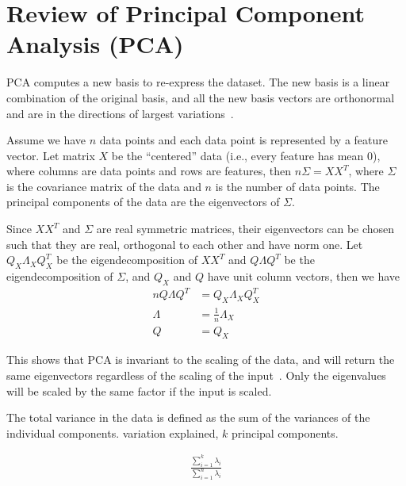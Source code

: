 \chapter{Review of Principal Component Analysis (PCA)}\label{app-pca}
PCA computes a new basis to re-express the dataset. The new basis is a linear
combination of the original basis, and all the new basis vectors are orthonormal
and are in the directions of largest variations~\cite{shlens2005}.

Assume we have $n$ data points and each data point is represented by a feature
vector. Let matrix $X$ be the ``centered'' data (i.e., every feature has mean
0), where columns are data points and rows are features, then $n\Sigma = XX^T$,
where $\Sigma$ is the covariance matrix of the data and $n$ is the number of
data points. The principal components of the data are the eigenvectors of
$\Sigma$.

Since $XX^T$ and $\Sigma$ are real symmetric matrices, their eigenvectors can be
chosen such that they are real, orthogonal to each other and have norm one. Let
$Q_X\Lambda_X Q_X^T$ be the  eigendecomposition of $XX^T$ and $Q\Lambda Q^T$ be
the eigendecomposition of $\Sigma$, and $Q_X$ and $Q$ have unit column
vectors, then we have
\begin{align*}
nQ\Lambda Q^T &= Q_X\Lambda_X Q_X^T  \\
\Lambda &= \frac{1}{n}\Lambda_X \\
Q &= Q_X
\end{align*}

This shows that PCA is invariant to the scaling of the data, and will return the
same eigenvectors regardless of the scaling of the input~\cite{pca14}. Only the
eigenvalues will be scaled by the same factor if the input is scaled. 

The total variance in the data is defined as the sum of the variances
of the individual components. variation explained, $k$ principal components.

\begin{align}
\frac{\sum_{i=1}^{k} \lambda_i}{\sum_{i=1}^{n}\lambda_i}
\end{align}

